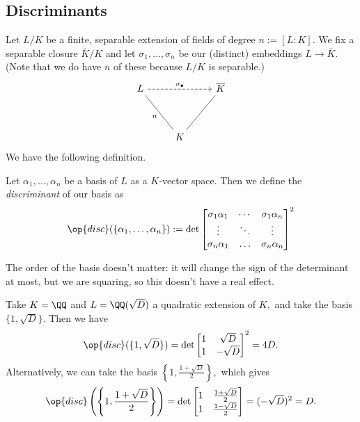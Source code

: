 \subsection{Discriminants}
Let $L/K$ be a finite, separable extension of fields of degree $n:=[L:K].$ We fix a separable closure $\overline K/K$ and let $\sigma_1,\ldots,\sigma_n$ be our (distinct) embeddings $L\to\overline K.$ (Note that we do have $n$ of these because $L/K$ is separable.)
\[\begin{tikzcd}
	L && {\overline K} \\
	\\
	& K
	\arrow["{\sigma_\bullet}", dashed, from=1-1, to=1-3]
	\arrow["n", no head, from=3-2, to=1-1]
	\arrow[no head, from=3-2, to=1-3]
\end{tikzcd}\]
We have the following definition.
\begin{defi}[Discriminant] \label{defi:disc}
    Let $\alpha_1,\ldots,\alpha_n$ be a basis of $L$ as a $K$-vector space. Then we define the \textit{discriminant} of our basis as
    \[\op{disc}(\{\alpha_1,\ldots,\alpha_n\}):=\det\begin{bmatrix}
        \sigma_1\alpha_1 & \cdots & \sigma_1\alpha_n \\
        \vdots & \ddots & \vdots \\
        \sigma_n\alpha_1 & \ldots & \sigma_n\alpha_n
    \end{bmatrix}^2\]
\end{defi}
\begin{remark}
    The order of the basis doesn't matter: it will change the sign of the determinant at most, but we are squaring, so this doesn't have a real effect.
\end{remark}
\begin{ex}
    Take $K=\QQ$ and $L=\QQ(\sqrt D)$ a quadratic extension of $K,$ and take the basis $\{1,\sqrt D\}.$ Then we have
    \[\op{disc}(\{1,\sqrt D\})=\det\begin{bmatrix}
        1 & \sqrt D \\
        1 & -\sqrt D
    \end{bmatrix}^2=4D.\]
    Alternatively, we can take the basis $\left\{1,\frac{1+\sqrt D}2\right\},$ which gives
    \[\op{disc}\left(\left\{1,\frac{1+\sqrt D}2\right\}\right)=\det\begin{bmatrix}
        1 & \frac{1+\sqrt D}2 \\
        1 & \frac{1-\sqrt D}2
    \end{bmatrix}=(-\sqrt D)^2=D.\]
\end{ex}
